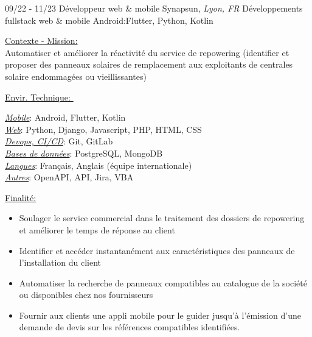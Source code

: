\documentclass[]{friggeri-cv}
\begin{document}
\begin{entrylist}
  \entry
    {09/22 - 11/23}
    {Développeur web \& mobile}
    {Synapsun, \textit{Lyon, FR}}
    {Développements fullstack web \& mobile Android:\hspace*{8mm}Flutter, Python, Kotlin}
\end{entrylist}
\vspace{-10pt}
\begin{minipage}[t]{0.65\linewidth}
\underline{Contexte - Mission: }\\
Automatiser et améliorer la réactivité du service de repowering (identifier et proposer des panneaux solaires de remplacement aux exploitants de centrales solaire endommagées ou vieillissantes)\\
\end{minipage} %
\begin{minipage}[t]{0.38\textwidth}
    \underline{Envir. Technique: }\
    \vspace{1mm}
    
\underline{\textit{Mobile}}: Android, Flutter, Kotlin\\
\underline{\textit{Web}}: Python, Django, Javascript, PHP, HTML, CSS\\
\underline{\textit{Devops, CI/CD}}: Git, GitLab\\
\underline{\textit{Bases de données}}: PostgreSQL, MongoDB\\
\underline{\textit{Langues}}: Français, Anglais (équipe internationale)\\
\underline{\textit{Autres}}: OpenAPI, API, Jira, VBA
    \end{minipage}
\vspace{1.5mm}
\underline{Finalité: }\\

\begin{itemize}
\setlength{\itemsep}{1pt}
\setlength{\parskip}{0pt}
\setlength{\parsep}{0pt}

\item Soulager le service commercial dans le traitement des dossiers de repowering et améliorer le temps de réponse au client
\item Identifier et accéder instantanément aux caractéristiques des panneaux de l'installation du client
\item Automatiser la recherche de panneaux compatibles au catalogue de la société ou disponibles chez nos fournisseurs
\item Fournir aux clients une appli mobile pour le guider jusqu'à l'émission d'une demande de devis sur les références compatibles identifiées.
\end{itemize}
\end{document}
